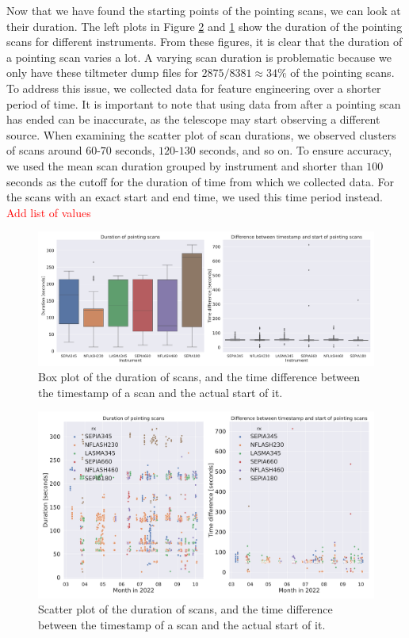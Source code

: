 Now that we have found the starting points of the pointing scans, we can look at their duration.
The left plots in Figure \ref{fig:scan_times_date} and \ref{fig:scan_times_box} show the duration of the pointing scans for different instruments.
From these figures, it is clear that the duration of a pointing scan varies a lot.
A varying scan duration is problematic because we only have these tiltmeter dump files for $2875/8381\approx 34\%$ of the pointing scans. 
To address this issue, we collected data for feature engineering over a shorter period of time.
It is important to note that using data from after a pointing scan has ended can be inaccurate, as the telescope may start observing a different source.
When examining the scatter plot of scan durations, we observed clusters of scans around $60$-$70$ seconds, $120$-$130$ seconds, and so on.
To ensure accuracy, we used the mean scan duration grouped by instrument and shorter than $100$ seconds as the cutoff for the duration of time from which we collected data.
For the scans with an exact start and end time, we used this time period instead. \textcolor{red}{Add list of values}


\begin{figure}[H]
    \centering
    \includegraphics[width=1.1\textwidth]{Tiltmeter plots/scan_duration_distribution_rx.pdf}
    \caption{Box plot of the duration of scans, and the time difference between the timestamp of a scan and the actual start of it.}
    \label{fig:scan_times_box}
\end{figure}

\begin{figure}[H]
    \centering
    \includegraphics[width=1.1\textwidth]{Tiltmeter plots/scan_duration_distribution_date.pdf}
    \caption{Scatter plot of the duration of scans, and the time difference between the timestamp of a scan and the actual start of it.}
    \label{fig:scan_times_date}
\end{figure}




